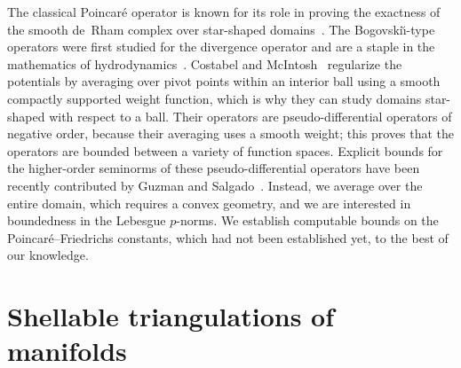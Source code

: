 \documentclass[10pt,a4paper]{article}
\begin{document}
\begin{remark}\label{remark:reg_Poinc_Bog}
    The classical Poincar\'e operator is known for its role in proving the exactness of the smooth de~Rham complex over star-shaped domains~\cite{lee2012smooth}.
    The Bogovski\u{\i}-type operators were first studied for the divergence operator and are a staple in the mathematics of hydrodynamics~\cite{bogovskii1979solution}.
    Costabel and McIntosh~\cite{costabel2010bogovskiui} regularize the potentials by averaging over pivot points within an interior ball using a smooth compactly supported weight function, 
    which is why they can study domains star-shaped with respect to a ball. 
    Their operators are pseudo-differential operators of negative order, 
    because their averaging uses a smooth weight; this proves that the operators are bounded between a variety of function spaces. 
    Explicit bounds for the higher-order seminorms of these pseudo-differential operators 
    have been recently contributed by Guzman and Salgado~\cite{guzman2021estimation}. 
    Instead, we average over the entire domain, which requires a convex geometry, 
    and we are interested in boundedness in the Lebesgue $p$-norms. 
    We establish computable bounds on the Poincar\'e--Friedrichs constants,
    which had not been established yet, to the best of our knowledge. 
\end{remark}












































\section{Shellable triangulations of manifolds}\label{section:advancedtriangulations}
\end{document}
